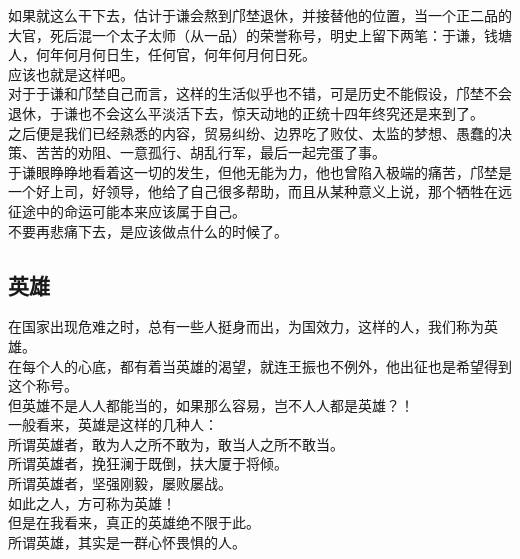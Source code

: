 \begin{multicols}{\theparacolNo}
如果就这么干下去，估计于谦会熬到邝埜退休，并接替他的位置，当一个正二品的大官，死后混一个太子太师（从一品）的荣誉称号，明史上留下两笔：于谦，钱塘人，何年何月何日生，任何官，何年何月何日死。\\

应该也就是这样吧。\\

对于于谦和邝埜自己而言，这样的生活似乎也不错，可是历史不能假设，邝埜不会退休，于谦也不会这么平淡活下去，惊天动地的正统十四年终究还是来到了。\\

之后便是我们已经熟悉的内容，贸易纠纷、边界吃了败仗、太监的梦想、愚蠢的决策、苦苦的劝阻、一意孤行、胡乱行军，最后一起完蛋了事。\\

于谦眼睁睁地看着这一切的发生，但他无能为力，他也曾陷入极端的痛苦，邝埜是一个好上司，好领导，他给了自己很多帮助，而且从某种意义上说，那个牺牲在远征途中的命运可能本来应该属于自己。\\

不要再悲痛下去，是应该做点什么的时候了。\\

\subsection{英雄}
在国家出现危难之时，总有一些人挺身而出，为国效力，这样的人，我们称为英雄。\\

在每个人的心底，都有着当英雄的渴望，就连王振也不例外，他出征也是希望得到这个称号。\\

但英雄不是人人都能当的，如果那么容易，岂不人人都是英雄？！\\

一般看来，英雄是这样的几种人：\\

所谓英雄者，敢为人之所不敢为，敢当人之所不敢当。\\

所谓英雄者，挽狂澜于既倒，扶大厦于将倾。\\

所谓英雄者，坚强刚毅，屡败屡战。\\

如此之人，方可称为英雄！\\

但是在我看来，真正的英雄绝不限于此。\\

所谓英雄，其实是一群心怀畏惧的人。\\


\end{multicols}
